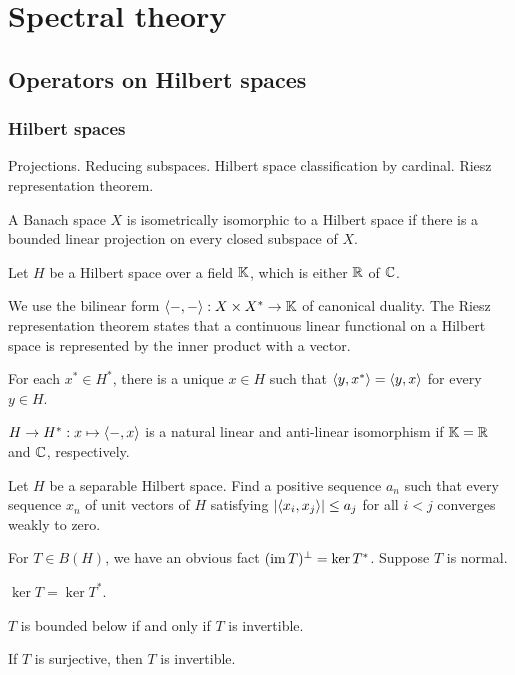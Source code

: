 \documentclass{../../large}
\begin{document}
\part{Spectral theory}

\chapter{Operators on Hilbert spaces}

\section{Hilbert spaces}
Projections. Reducing subspaces.
Hilbert space classification by cardinal.
Riesz representation theorem.
\begin{prb}
\begin{parts}
\item A Banach space $X$ is isometrically isomorphic to a Hilbert space if there is a bounded linear projection on every closed subspace of $X$.
\end{parts}
\end{prb}

\begin{prb}
Let $H$ be a Hilbert space over a field $\mathbb{K}$, which is either $\mathbb{R}$ of $\mathbb{C}$.


We use the bilinear form $\langle-,-\rangle:X\times X^*\to\mathbb{K}$ of canonical duality.
The Riesz representation theorem states that a continuous linear functional on a Hilbert space is represented by the inner product with a vector.
\begin{parts}
\item For each $x^*\in H^*$, there is a unique $x\in H$ such that $\langle y,x^*\rangle=\langle y,x\rangle$ for every $y\in H$.
\item $H\to H^*:x\mapsto\langle-,x\rangle$ is a natural linear and anti-linear isomorphism if $\mathbb{K}=\mathbb{R}$ and $\mathbb{C}$, respectively.
\end{parts}
\end{prb}



Let $H$ be a separable Hilbert space.
Find a positive sequence $a_n$ such that every sequence $x_n$ of unit vectors of $H$ satisfying $|\langle x_i,x_j\rangle|\le a_j$ for all $i<j$ converges weakly to zero.



\begin{prb}
For $T\in B(H)$, we have an obvious fact $(\operatorname{im} T)^\perp=\ker T^*$.
Suppose $T$ is normal.
\begin{parts}
\item $\ker T=\ker T^*$.
\item $T$ is bounded below if and only if $T$ is invertible.
\item If $T$ is surjective, then $T$ is invertible.
\end{parts}
\end{prb}
\end{document}
